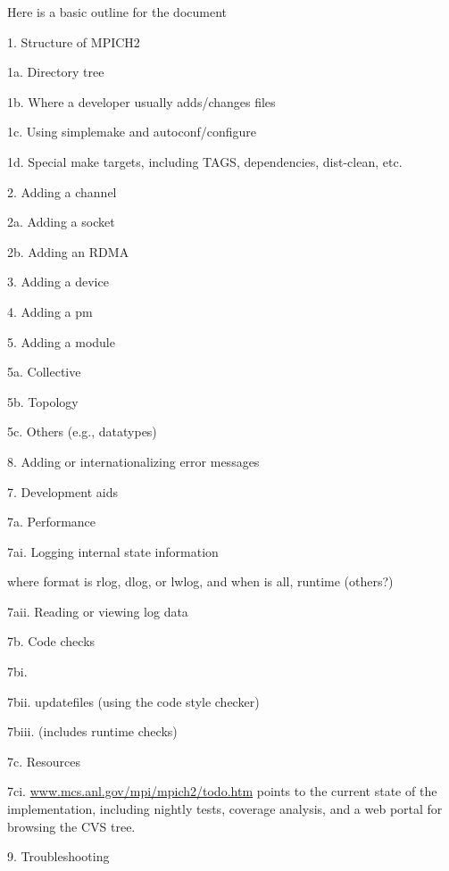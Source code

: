 \documentclass[dvipdfm,11pt]{article}
\begin{document}

\cleardoublepage

\tableofcontents
\clearpage

\pagestyle{headings}

\obeylines
\obeyspaces

Here is a basic outline for the document

1. Structure of MPICH2 

   1a. Directory tree

   1b. Where a developer usually adds/changes files

   1c. Using simplemake and autoconf/configure
 
   1d. Special make targets, including TAGS, dependencies, dist-clean, etc.

2. Adding a channel

   2a. Adding a socket
  
   2b. Adding an RDMA

3. Adding a device

4. Adding a pm

5. Adding a module

  5a. Collective

  

  5b. Topology

  5c. Others (e.g., datatypes)

8. Adding or internationalizing error messages

7. Development aids

  7a. Performance

      7ai. Logging internal state information
  

      where format is rlog, dlog, or lwlog, and when is all, runtime (others?)

      7aii. Reading or viewing log data

   7b. Code checks
 
      7bi. 

      7bii.  updatefiles (using the code style checker)

      7biii.  (includes runtime checks)

   7c. Resources
      
      7ci. \url{www.mcs.anl.gov/mpi/mpich2/todo.htm} points to the
      current state of the implementation, including nightly tests, 
      coverage analysis, and a web portal for browsing the CVS tree.

9. Troubleshooting
\end{document}

